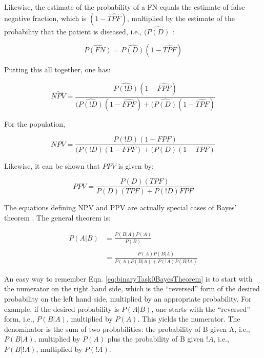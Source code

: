 \documentclass[
]{book}
\begin{document}
Likewise, the estimate of the probability of a FN equals the estimate of false negative fraction, which is \((1-\widehat{TPF})\), multiplied by the estimate of the probability that the patient is diseased, i.e., \((\widehat{P(D)}\) :

\begin{equation} 
\widehat{P(FN)}=\widehat{P(D)}(1-\widehat{TPF})
\label{eq:binaryTask0PFNEst}
\end{equation}

Putting this all together, one has:

\begin{equation} 
\widehat{NPV}=\frac{\widehat{P(!D)}(1-\widehat{FPF})}{(\widehat{P(!D)}(1-\widehat{FPF})+(\widehat{P(D)}(1-\widehat{TPF})}
\label{eq:binaryTask0NPVFormula}
\end{equation}

For the population,

\begin{equation} 
NPV=\frac{P(!D)(1-FPF)}{(P(!D)(1-FPF)+(P(D)(1-TPF)}
\label{eq:binaryTask0NPVFormula-pop}
\end{equation}

Likewise, it can be shown that \(PPV\) is given by:

\begin{equation} 
PPV =\frac{P(D)(TPF)}{P(D)(TPF)+P(!D)FPF}
\label{eq:binaryTask0PPV}
\end{equation}

The equations defining NPV and PPV are actually special cases of Bayes' theorem \citep{RN1492}. The general theorem is:

\begin{equation} 
\begin{aligned}
P(A|B)&=\frac{P(B|A)P(A)}{P(B)} \\
\\
&=\frac{P(A)P(B|A)}{P(A)P(B|A)+P(!A)P(B|!A)}
\end{aligned}
\label{eq:binaryTask0BayesTheorem}
\end{equation}

An easy way to remember Eqn. \eqref{eq:binaryTask0BayesTheorem} is to start with the numerator on the right hand side, which is the ``reversed'' form of the desired probability on the left hand side, multiplied by an appropriate probability. For example, if the desired probability is \(P(A|B)\), one starts with the ``reversed'' form, i.e., \(P(B|A)\), multiplied by \(P(A)\). This yields the numerator. The denominator is the sum of two probabilities: the probability of B given A, i.e., \(P(B|A)\), multiplied by \(P(A)\) plus the probability of B given \(!A\), i.e., \(P(B|!A)\), multiplied by \(P(!A)\).
\end{document}
